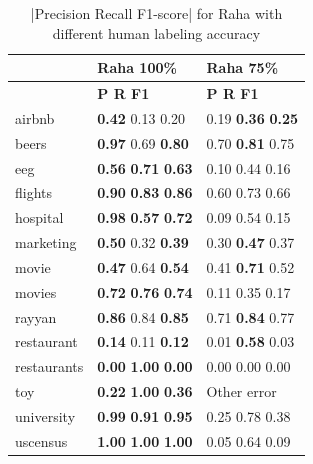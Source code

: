 \begin{table}
\centering
\caption{|Precision Recall F1-score| for Raha with different human labeling accuracy}
\label{tab:raha_empirical}
\begin{tabular}{lll}
\toprule
{} & Raha 100\% & Raha 75\% \\
\midrule
 & \textbf{\space\space\space P \space\space\space\space R \space\space\space F1} & \textbf{\space\space\space P \space\space\space\space R \space\space\space F1} \\
airbnb & \textbf{0.42} 0.13 0.20 & 0.19 \textbf{0.36} \textbf{0.25} \\
beers & \textbf{0.97} 0.69 \textbf{0.80} & 0.70 \textbf{0.81} 0.75 \\
eeg & \textbf{0.56} \textbf{0.71} \textbf{0.63} & 0.10 0.44 0.16 \\
flights & \textbf{0.90} \textbf{0.83} \textbf{0.86} & 0.60 0.73 0.66 \\
hospital & \textbf{0.98} \textbf{0.57} \textbf{0.72} & 0.09 0.54 0.15 \\
marketing & \textbf{0.50} 0.32 \textbf{0.39} & 0.30 \textbf{0.47} 0.37 \\
movie & \textbf{0.47} 0.64 \textbf{0.54} & 0.41 \textbf{0.71} 0.52 \\
movies & \textbf{0.72} \textbf{0.76} \textbf{0.74} & 0.11 0.35 0.17 \\
rayyan & \textbf{0.86} 0.84 \textbf{0.85} & 0.71 \textbf{0.84} 0.77 \\
restaurant & \textbf{0.14} 0.11 \textbf{0.12} & 0.01 \textbf{0.58} 0.03 \\
restaurants & \textbf{0.00} \textbf{1.00} \textbf{0.00} & 0.00 0.00 0.00 \\
toy & \textbf{0.22} \textbf{1.00} \textbf{0.36} & Other error \\
university & \textbf{0.99} \textbf{0.91} \textbf{0.95} & 0.25 0.78 0.38 \\
uscensus & \textbf{1.00} \textbf{1.00} \textbf{1.00} & 0.05 0.64 0.09 \\
\bottomrule
\end{tabular}
\end{table}